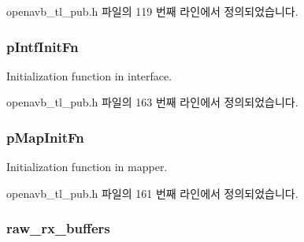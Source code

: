 openavb\+\_\+tl\+\_\+pub.\+h 파일의 119 번째 라인에서 정의되었습니다.

\subsubsection[{\texorpdfstring{p\+Intf\+Init\+Fn}{pIntfInitFn}}]{ p\+Intf\+Init\+Fn}\hypertarget{structopenavb__tl__cfg__t_a1e93bc0d2fd6ea831a182dae7b7db6ac}{}\label{structopenavb__tl__cfg__t_a1e93bc0d2fd6ea831a182dae7b7db6ac}


Initialization function in interface. 



openavb\+\_\+tl\+\_\+pub.\+h 파일의 163 번째 라인에서 정의되었습니다.

\subsubsection[{\texorpdfstring{p\+Map\+Init\+Fn}{pMapInitFn}}]{ p\+Map\+Init\+Fn}\hypertarget{structopenavb__tl__cfg__t_a87d7ea4a63a493fb0c5ca7f8a1494a94}{}\label{structopenavb__tl__cfg__t_a87d7ea4a63a493fb0c5ca7f8a1494a94}


Initialization function in mapper. 



openavb\+\_\+tl\+\_\+pub.\+h 파일의 161 번째 라인에서 정의되었습니다.

\subsubsection[{\texorpdfstring{raw\+\_\+rx\+\_\+buffers}{raw_rx_buffers}}]{ raw\+\_\+rx\+\_\+buffers}\hypertarget{structopenavb__tl__cfg__t_a878cfe34b25df40f0858bff76cbfd4e6}{}\label{structopenavb__tl__cfg__t_a878cfe34b25df40f0858bff76cbfd4e6}


